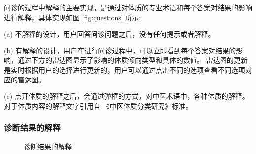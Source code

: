 问诊的过程中解释的主要实现，是通过对体质的专业术语和每个答案对结果的影响进行解释，具体实现如图 \ref{fig:questions} 所示:

(a) 不解释的设计，用户回答问诊问题之后，没有任何提示或者解释。

(b) 有解释的设计，用户在进行问诊过程中，可以立即看到每个答案对结果的影响，通过下方的雷达图显示了影响的体质倾向类型和具体的数值。
雷达图的更新是实时根据用户的选择进行更新的，用户可以通过点击不同的选项查看不同选项对应的雷达图。

(c) 点开体质的解释之后，会通过弹框的方式，对中医术语中，各种体质的解释。对于体质内容的解释文字引用自 《中医体质分类研究》标准\cite{王琦20099}。


\subsubsection{诊断结果的解释}
\begin{figure}[htbp]
    \centering
    \caption{诊断结果的解释}
    \label{fig:exp_result}
\end{figure}

